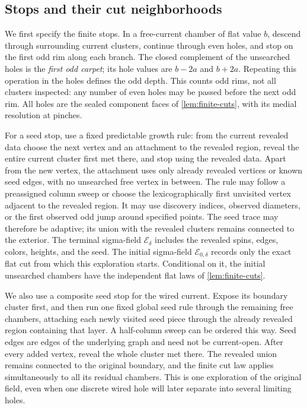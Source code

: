 \subsection{Stops and their cut neighborhoods}

We first specify the finite stops. In a free-current chamber of flat value
\(b\), descend through surrounding current clusters, continue through even
holes, and stop on the first odd rim along each branch. The closed complement
of the unsearched holes is the \emph{first odd carpet}; its hole values are
\(b-2a\) and \(b+2a\). Repeating this operation in the holes defines the
odd depth. This counts odd rims, not all clusters inspected: any number of
even holes may be passed before the next odd rim. All holes are the sealed
component faces of \cref{lem:finite-cuts}, with its medial resolution at
pinches.

For a seed stop, use a fixed predictable growth rule: from the current
revealed data choose the next vertex and an attachment to the revealed
region, reveal the entire current cluster first met there, and stop using
the revealed data. Apart from the new vertex, the attachment uses only
already revealed vertices or known seed edges, with no unsearched free
vertex in between. The rule may follow a preassigned column sweep or choose
the lexicographically first unvisited vertex adjacent to the revealed
region. It may use discovery indices, observed diameters, or the first
observed odd jump around specified points. The seed trace may therefore
be adaptive; its union with the revealed clusters remains connected to
the exterior.
The terminal sigma-field \(\mathcal E_\delta\) includes the revealed
spins, edges, colors, heights, and the seed. The initial sigma-field
\(\mathcal E_{0,\delta}\) records only the exact flat cut from which this
exploration starts. Conditional on it, the initial unsearched chambers
have the independent flat laws of \cref{lem:finite-cuts}.

We also use a composite seed stop for the wired current. Expose its
boundary cluster first, and then run one fixed global seed rule through
the remaining free chambers, attaching each newly visited seed piece
through the already revealed region containing that layer. A half-column sweep can be ordered
this way. Seed edges are edges of the underlying graph and need not be
current-open. After every added vertex, reveal the whole cluster met
there. The revealed union remains connected to the original boundary,
and the finite cut law applies simultaneously to all its residual
chambers. This is one exploration of the original field, even when one
discrete wired hole will later separate into several limiting holes.

